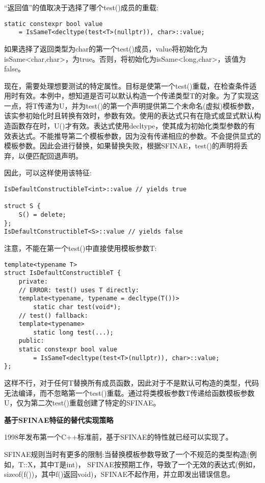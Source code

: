 “返回值”的值取决于选择了哪个test()成员的重载:

\begin{lstlisting}[style=styleCXX]
static constexpr bool value
	= IsSameT<decltype(test<T>(nullptr)), char>::value;
\end{lstlisting}

如果选择了返回类型为char的第一个test()成员，value将初始化为isSame<char,char>，为true。否则，将初始化为isSame<long,char>，该值为false。

现在，需要处理想要测试的特定属性。目标是使第一个test()重载，在检查条件适用时有效。本例中，想知道是否可以默认构造一个传递类型T的对象。为了实现这一点，将T传递为U，并为test()的第一个声明提供第二个未命名(虚拟)模板参数，该实参初始化时且转换有效时，参数有效。使用的表达式只有在隐式或显式默认构造函数存在时，U()才有效。表达式使用decltype，使其成为初始化类型参数的有效表达式。不能推导第二个模板参数，因为没有传递相应的参数。不会提供显式的模板参数。因此会进行替换，如果替换失败，根据SFINAE，test()的声明将丢弃，以便匹配回退声明。

因此，可以这样使用该特征:

\begin{lstlisting}[style=styleCXX]
IsDefaultConstructibleT<int>::value // yields true

struct S {
	S() = delete;
};
IsDefaultConstructibleT<S>::value // yields false
\end{lstlisting}

注意，不能在第一个test()中直接使用模板参数T:

\begin{lstlisting}[style=styleCXX]
template<typename T>
struct IsDefaultConstructibleT {
	private:
	// ERROR: test() uses T directly:
	template<typename, typename = decltype(T())>
		static char test(void*);
	// test() fallback:
	template<typename>
		static long test(...);
	public:
	static constexpr bool value
		= IsSameT<decltype(test<T>(nullptr)), char>::value;
};
\end{lstlisting}

这样不行，对于任何T替换所有成员函数，因此对于不是默认可构造的类型，代码无法编译，而不忽略第一个test()重载。通过将类模板参数T传递给函数模板参数U，仅为第二次test()重载创建了特定的SFINAE。

\noindent
\textbf{基于SFINAE特征的替代实现策略}

1998年发布第一个C++标准前，基于SFINAE的特性就已经可以实现了。

\begin{tcolorbox}[colback=webgreen!5!white,colframe=webgreen!75!black]
\hspace*{0.75cm}SFINAE规则当时有更多的限制:当替换模板参数导致了一个不规范的类型构造(例如，T::X，其中T是int)， SFINAE按预期工作，导致了一个无效的表达式(例如，sizeof(f())，其中f()返回void)，SFINAE不起作用，并立即发出错误信息。
\end{tcolorbox}

